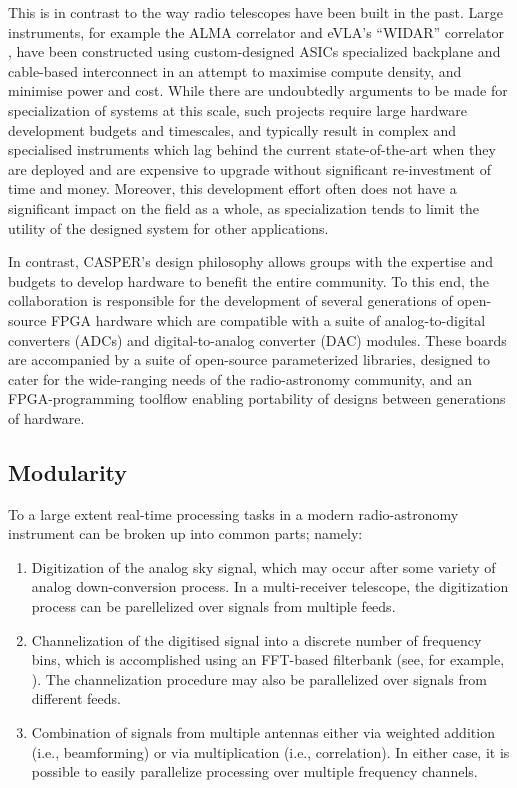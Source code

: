 \documentclass{ws-jai}
\begin{document}
This is in contrast to the way radio telescopes have been built in the past.
Large instruments, for example the ALMA correlator \citep{alma-correlator} and
eVLA's ``WIDAR'' correlator \citep{evla}, have been constructed using
custom-designed ASICs specialized
backplane and cable-based interconnect in an attempt to maximise compute
density, and minimise power and cost. While there are undoubtedly arguments to be made for specialization of systems at this scale, such projects require large
hardware development budgets and timescales, and typically result in complex
and specialised instruments which lag behind the current state-of-the-art when they are deployed and are expensive to upgrade without significant
re-investment of time and money. Moreover, this development effort often does not have a significant impact on the field as a whole, as specialization tends to limit the utility of the designed system for other applications.

In contrast, CASPER's design philosophy allows groups with the expertise and
budgets to develop hardware to benefit the entire community. To this end, the collaboration
is responsible for the development of several generations of open-source FPGA hardware which are compatible with a suite of analog-to-digital converters (ADCs) and digital-to-analog converter (DAC) modules. These boards are accompanied by a suite of open-source parameterized libraries, designed to cater for the wide-ranging needs of the radio-astronomy community, and an FPGA-programming toolflow enabling portability of designs between generations of hardware.



\subsection{Modularity}

To a large extent real-time processing tasks in a modern
radio-astronomy instrument can be broken up into common parts; namely:
\begin{enumerate}
    \item Digitization of the analog sky signal, which may occur after
    some variety of analog down-conversion process. In a multi-receiver telescope, the digitization process can be parellelized over signals from multiple feeds.
    
    \item Channelization of the digitised signal into a discrete number of
    frequency bins, which is accomplished using an FFT-based filterbank
    (see, for example, \citet{specbook}). The channelization procedure may also be parallelized over signals from different feeds.
    
    \item Combination of signals from multiple antennas either via weighted addition (i.e., beamforming) or via multiplication (i.e.,
    correlation). In either case, it is possible to easily parallelize processing
    over multiple frequency channels.
\end{enumerate}
\end{document}
